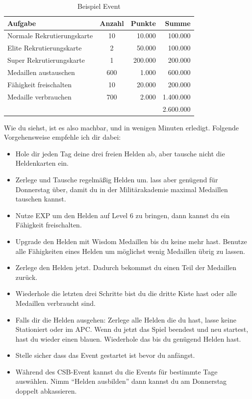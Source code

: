 \documentclass[fontsize=12pt,a4paper]{scrartcl}[2003/01/01]
\begin{document}
\begin{table}[h!]
  \centering
    \begin{tabularx}{0.7\textwidth}{lcrr}
      Aufgabe & Anzahl & Punkte & Summe \\
      \hline
      Normale Rekrutierungskarte & 10 & 10.000 & 100.000 \\
      Elite Rekrutierungskarte & 2 & 50.000 & 100.000 \\
      Super Rekrutierungskarte & 1 & 200.000 & 200.000 \\
      Medaillen austauschen & 600 & 1.000 & 600.000 \\
      Fähigkeit freischalten & 10 & 20.000 & 200.000 \\
      Medaille verbrauchen & 700 & 2.000 & 1.400.000 \\
      \hline
      ~ & ~ & ~ & 2.600.000 \\
    \end{tabularx}
  \caption[Event]{Beispiel Event}
\end{table}

Wie du siehst, ist es also machbar, und in wenigen Minuten erledigt.
Folgende Vorgehensweise empfehle ich dir dabei:

\begin{itemize}
  \item Hole dir jeden Tag deine drei freien Helden ab, aber tausche nicht die Heldenkarten ein.
  \item Zerlege und Tausche regelmäßig Helden um. lass aber genügend für Donnerstag über, damit du in der Militärakademie maximal Medaillen tauschen kannst.
  \item Nutze EXP um den Helden auf Level 6 zu bringen, dann kannst du ein Fähigkeit freischalten.
  \item Upgrade den Helden mit Wisdom Medaillen bis du keine mehr hast. Benutze alle Fähigkeiten eines Helden um möglichst wenig Medaillen übrig zu lassen.
  \item Zerlege den Helden jetzt. Dadurch bekommst du einen Teil der Medaillen zurück.
  \item Wiederhole die letzten drei Schritte bist du die dritte Kiste hast oder alle Medaillen verbraucht sind.
  \item Falls dir die Helden ausgehen: Zerlege alle Helden die du hast, lasse keine Stationiert oder im APC. 
        Wenn du jetzt das Spiel beendest und neu startest, hast du wieder einen blauen. Wiederhole das bis du genügend Helden hast.
  \item Stelle sicher dass das Event gestartet ist bevor du anfängst.
  \item Während des CSB-Event kannst du die Events für bestimmte Tage auswählen. Nimm "`Helden ausbilden"' dann kannst du am Donnerstag doppelt abkassieren.
\end{itemize}	
\end{document}
